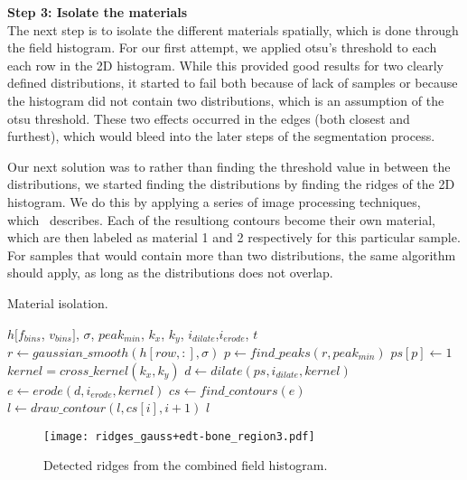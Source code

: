 \vspace{\baselineskip}
\noindent\textbf{Step 3: Isolate the materials} \\
The next step is to isolate the different materials spatially, which is done through the field histogram.
For our first attempt, we applied otsu's threshold to each each row in the 2D histogram. 
While this provided good results for two clearly defined distributions, it started to fail both because of lack of samples or because the histogram did not contain two distributions, which is an assumption of the otsu threshold. 
These two effects occurred in the edges (both closest and furthest), which would bleed into the later steps of the segmentation process. 

Our next solution was to rather than finding the threshold value in between the distributions, we started finding the distributions by finding the ridges of the 2D histogram. 
We do this by applying a series of image processing techniques, which~ describes.
Each of the resultiong contours become their own material, which are then labeled as material 1 and 2 respectively for this particular sample. For samples that would contain more than two distributions, the same algorithm should apply, as long as the distributions does not overlap. 

\begin{algorithm}
    \caption{Material isolation.}
    \label{alg:material}
    \begin{algorithmic}
         {$h[f_{bins}$, $v_{bins}]$, $\sigma$, $peak_{min}$, $k_x$, $k_y$, \newline \indent \indent $i_{dilate}$,$i_{erode}$, $t$}
                \State $r \gets gaussian\_smooth(h[row,:], \sigma)$
                \State $p \gets find\_peaks(r, peak_{min})$
                \State $ps[p] \gets 1$
            \EndFor
            \State $kernel = cross\_kernel(k_x, k_y)$
            \State $d \gets dilate(ps, i_{dilate}, kernel)$
            \State $e \gets erode(d, i_{erode}, kernel)$
            \State $cs \gets find\_contours(e)$
                    \State $l \gets draw\_contour(l, cs[i], i+1)$
                \EndIf
            \EndFor
            \Return $l$
        \EndFunction
    \end{algorithmic}
\end{algorithm}

\begin{figure}
    \texttt{[image: ridges\_gauss+edt-bone\_region3.pdf]}
    \caption{Detected ridges from the combined field histogram.}
    \label{fig:curves}
\end{figure}

